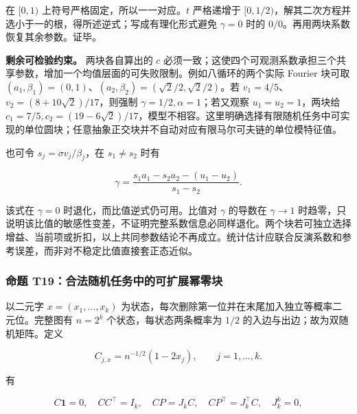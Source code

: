 \documentclass[11pt,a4paper]{article}
\begin{document}
在 \([0,1)\) 上符号严格固定，所以一一对应。\(t\) 严格递增于
\([0,1/2)\)，解其二次方程并选小于一的根，得所述逆式；写成有理化形式避免
\(\gamma=0\) 时的 \(0/0\)。再用两块系数恢复其余参数。证毕。

\textbf{剩余可检验约束。} 两块各自算出的 \(c\)
必须一致；这使四个可观测系数承担三个共享参数，增加一个均值层面的可失败限制。例如八循环的两个实际
Fourier 块可取
\((a_1,\beta_1)=(0,1)\)、\((a_2,\beta_2)=(\sqrt2/2,\sqrt2/2)\)。若
\(v_1=4/5\)、\(v_2=(8+10\sqrt2)/17\)，则强制
\(\gamma=1/2,\alpha=1\)；若又观察 \(u_1=u_2=1\)，两块给
\(c_1=7/5,c_2=(19-6\sqrt2)/17\)，模型不相容。这里明确选择有限随机任务中可实现的单位圆块；任意抽象正交块并不自动对应有限马尔可夫链的单位模特征值。

\par
\noindent\begin{minipage}{\linewidth}

也可令 \(s_j=\sigma v_j/\beta_j\)，在 \(s_1\ne s_2\) 时有

\[
\gamma=\frac{s_1a_1-s_2a_2-(u_1-u_2)}{s_1-s_2}.
\]

\end{minipage}\par

该式在 \(\gamma=0\) 时退化，而比值逆式仍可用。比值对 \(\gamma\) 的导数在
\(\gamma\to1\)
时趋零，只说明该比值的敏感性变差，不证明完整系数信息必同样退化。两个块若可独立选择增益、当前项或折扣，以上共同参数结论不再成立。统计估计应联合反演系数和参考误差，而非对不稳定比值直接套正态近似。

\subsubsection{命题
T19：合法随机任务中的可扩展幂零块}\label{ux547dux9898-t19ux5408ux6cd5ux968fux673aux4efbux52a1ux4e2dux7684ux53efux6269ux5c55ux5e42ux96f6ux5757}

\par
\noindent\begin{minipage}{\linewidth}

以二元字 \(x=(x_1,\ldots,x_k)\)
为状态，每次删除第一位并在末尾加入独立等概率二元位。完整图有 \(n=2^k\)
个状态，每状态两条概率为 \(1/2\) 的入边与出边；故为双随机矩阵。定义

\[
C_{j,x}=n^{-1/2}(1-2x_j),\qquad j=1,\ldots,k.
\]

\end{minipage}\par

\par
\noindent\begin{minipage}{\linewidth}

有

\[
C\mathbf1=0,\quad CC^\top=I_k,\quad
CP=J_kC,\quad CP^\top=J_k^\top C,\quad J_k^k=0,
\]

\end{minipage}\par
\end{document}
